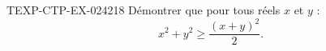\begin{exercice}{TEXP-CTP-EX-024}{2}{18}
Démontrer que pour tous réels $x$ et $y$ :
\[ x^2 + y^2 \geq \frac{(x+y)^2}{2}. \]

\end{exercice}
